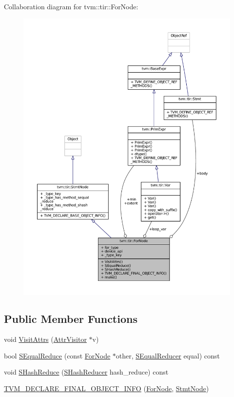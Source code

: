 Collaboration diagram for tvm\+:\+:tir\+:\+:For\+Node\+:
\nopagebreak
\begin{figure}[H]
\begin{center}
\leavevmode
\includegraphics[width=350pt]{classtvm_1_1tir_1_1ForNode__coll__graph}
\end{center}
\end{figure}
\subsection*{Public Member Functions}
\begin{DoxyCompactItemize}
\item 
void \hyperlink{classtvm_1_1tir_1_1ForNode_a014d871983a05a0c16efd6deb83a7472}{Visit\+Attrs} (\hyperlink{classtvm_1_1AttrVisitor}{Attr\+Visitor} $\ast$v)
\item 
bool \hyperlink{classtvm_1_1tir_1_1ForNode_ab622625051cbb8b2b8939fa369de4542}{S\+Equal\+Reduce} (const \hyperlink{classtvm_1_1tir_1_1ForNode}{For\+Node} $\ast$other, \hyperlink{classtvm_1_1SEqualReducer}{S\+Equal\+Reducer} equal) const 
\item 
void \hyperlink{classtvm_1_1tir_1_1ForNode_a4af8f73401ef7a083e08b934fca88c1d}{S\+Hash\+Reduce} (\hyperlink{classtvm_1_1SHashReducer}{S\+Hash\+Reducer} hash\+\_\+reduce) const 
\item 
\hyperlink{classtvm_1_1tir_1_1ForNode_acb5914475817df48e3a7d61e8e993ebf}{T\+V\+M\+\_\+\+D\+E\+C\+L\+A\+R\+E\+\_\+\+F\+I\+N\+A\+L\+\_\+\+O\+B\+J\+E\+C\+T\+\_\+\+I\+N\+FO} (\hyperlink{classtvm_1_1tir_1_1ForNode}{For\+Node}, \hyperlink{classtvm_1_1tir_1_1StmtNode}{Stmt\+Node})
\end{DoxyCompactItemize}
